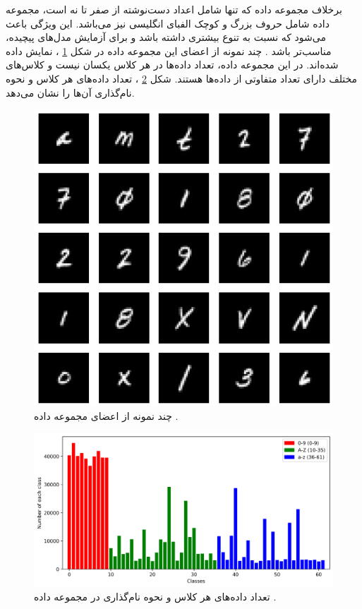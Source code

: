 برخلاف مجموعه داده
که تنها شامل اعداد دست‌نوشته از صفر تا نه است، مجموعه داده
شامل حروف بزرگ و کوچک الفبای انگلیسی نیز می‌باشد. این ویژگی باعث می‌شود که
نسبت به
تنوع بیشتری داشته باشد و برای آزمایش مدل‌های پیچیده‌، مناسب‌تر باشد
\cite{caldas2018leaf}.
چند نمونه از اعضای این مجموعه داده در شکل
\ref{femnist}%
، نمایش داده شده‌اند.
در این مجموعه داده، تعداد داده‌ها در هر کلاس یکسان نیست و کلاس‌های مختلف دارای تعداد متفاوتی از داده‌ها هستند. شکل
\ref{count_all_classes}%
، تعداد داده‌های هر کلاس و نحوه نام‌گذاری آن‌ها را نشان می‌دهد.


\begin{figure}[b!]
	\centering
	\includegraphics[scale=0.5]{images/chap5/femnist.png}%
	\caption{%
		چند نمونه از اعضای مجموعه داده
		\cite{holzer2023dynamically}.
	}
	\label{femnist}
	\centering
\end{figure}


\begin{figure}[t]
	\centering
	\includegraphics[scale=0.7]{images/chap5/count_all_classes.png}%
	\caption{%
تعداد داده‌های هر کلاس و نحوه نام‌گذاری در مجموعه داده
		.
	}
	\label{count_all_classes}
	\centering
\end{figure}

